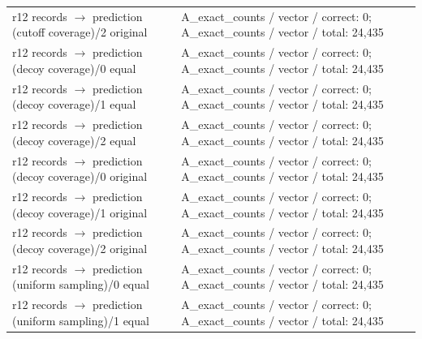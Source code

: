 \begin{longtable}{@{}>{\raggedright\arraybackslash}p{1.800in}>{\raggedright\arraybackslash}p{4.200in}@{}}
r12 records $\to$ prediction (cutoff coverage)/\allowbreak{}2 original & A\_\allowbreak{}exact\_\allowbreak{}counts /\allowbreak{} vector /\allowbreak{} correct: 0; A\_\allowbreak{}exact\_\allowbreak{}counts /\allowbreak{} vector /\allowbreak{} total: 24,435 \\
r12 records $\to$ prediction (decoy coverage)/\allowbreak{}0 equal & A\_\allowbreak{}exact\_\allowbreak{}counts /\allowbreak{} vector /\allowbreak{} correct: 0; A\_\allowbreak{}exact\_\allowbreak{}counts /\allowbreak{} vector /\allowbreak{} total: 24,435 \\
r12 records $\to$ prediction (decoy coverage)/\allowbreak{}1 equal & A\_\allowbreak{}exact\_\allowbreak{}counts /\allowbreak{} vector /\allowbreak{} correct: 0; A\_\allowbreak{}exact\_\allowbreak{}counts /\allowbreak{} vector /\allowbreak{} total: 24,435 \\
r12 records $\to$ prediction (decoy coverage)/\allowbreak{}2 equal & A\_\allowbreak{}exact\_\allowbreak{}counts /\allowbreak{} vector /\allowbreak{} correct: 0; A\_\allowbreak{}exact\_\allowbreak{}counts /\allowbreak{} vector /\allowbreak{} total: 24,435 \\
r12 records $\to$ prediction (decoy coverage)/\allowbreak{}0 original & A\_\allowbreak{}exact\_\allowbreak{}counts /\allowbreak{} vector /\allowbreak{} correct: 0; A\_\allowbreak{}exact\_\allowbreak{}counts /\allowbreak{} vector /\allowbreak{} total: 24,435 \\
r12 records $\to$ prediction (decoy coverage)/\allowbreak{}1 original & A\_\allowbreak{}exact\_\allowbreak{}counts /\allowbreak{} vector /\allowbreak{} correct: 0; A\_\allowbreak{}exact\_\allowbreak{}counts /\allowbreak{} vector /\allowbreak{} total: 24,435 \\
r12 records $\to$ prediction (decoy coverage)/\allowbreak{}2 original & A\_\allowbreak{}exact\_\allowbreak{}counts /\allowbreak{} vector /\allowbreak{} correct: 0; A\_\allowbreak{}exact\_\allowbreak{}counts /\allowbreak{} vector /\allowbreak{} total: 24,435 \\
r12 records $\to$ prediction (uniform sampling)/\allowbreak{}0 equal & A\_\allowbreak{}exact\_\allowbreak{}counts /\allowbreak{} vector /\allowbreak{} correct: 0; A\_\allowbreak{}exact\_\allowbreak{}counts /\allowbreak{} vector /\allowbreak{} total: 24,435 \\
r12 records $\to$ prediction (uniform sampling)/\allowbreak{}1 equal & A\_\allowbreak{}exact\_\allowbreak{}counts /\allowbreak{} vector /\allowbreak{} correct: 0; A\_\allowbreak{}exact\_\allowbreak{}counts /\allowbreak{} vector /\allowbreak{} total: 24,435 \\

\end{longtable}
